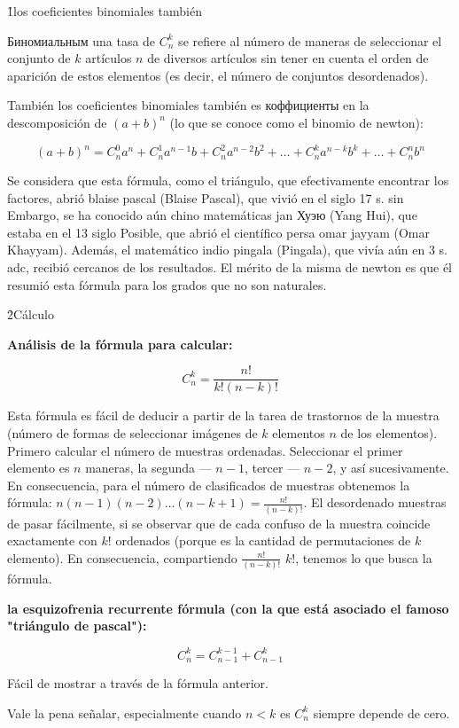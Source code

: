 \h1{los coeficientes binomiales también}

Биномиальным una tasa de $C_n^k$ se refiere al número de maneras de seleccionar el conjunto de $k$ artículos $n$ de diversos artículos sin tener en cuenta el orden de aparición de estos elementos (es decir, el número de conjuntos desordenados).

También los coeficientes binomiales también es коффициенты en la descomposición de $(a+b)^n$ (lo que se conoce como el binomio de newton):

$$ (a+b)^n = C_n^0 a^n + C_n^1 a^{n-1} b + C_n^2 a^{n-2} b^2 + \ldots + C_n^k a^{n-k} b^k + \ldots + C_n^n b^n $$

Se considera que esta fórmula, como el triángulo, que efectivamente encontrar los factores, abrió blaise pascal (Blaise Pascal), que vivió en el siglo 17 s. sin Embargo, se ha conocido aún chino matemáticas jan Хуэю (Yang Hui), que estaba en el 13 siglo Posible, que abrió el científico persa omar jayyam (Omar Khayyam). Además, el matemático indio pingala (Pingala), que vivía aún en 3 s. adc, recibió cercanos de los resultados. El mérito de la misma de newton es que él resumió esta fórmula para los grados que no son naturales.

\h2{Cálculo}

\bf{Análisis de la fórmula} para calcular:

$$ C_n^k = \frac{n!}{k! (n-k)!} $$

Esta fórmula es fácil de deducir a partir de la tarea de trastornos de la muestra (número de formas de seleccionar imágenes de $k$ elementos $n$ de los elementos). Primero calcular el número de muestras ordenadas. Seleccionar el primer elemento es $n$ maneras, la segunda --- $n-1$, tercer --- $n-2$, y así sucesivamente. En consecuencia, para el número de clasificados de muestras obtenemos la fórmula: $ n (n-1) (n-2) \ldots (n-k+1) = \frac{n!}{(n-k)!} $. El desordenado muestras de pasar fácilmente, si se observar que de cada confuso de la muestra coincide exactamente con $k!$ ordenados (porque es la cantidad de permutaciones de $k$ elemento). En consecuencia, compartiendo $\frac{n!}{(n-k)!}$ $k!$, tenemos lo que busca la fórmula.

\bf{la esquizofrenia recurrente fórmula} (con la que está asociado el famoso "triángulo de pascal"):

$$ C_n^k = C_{n-1}^{k-1} + C_{n-1}^k $$

Fácil de mostrar a través de la fórmula anterior.

Vale la pena señalar, especialmente cuando $n<k$ es $C_n^k$ siempre depende de cero.

